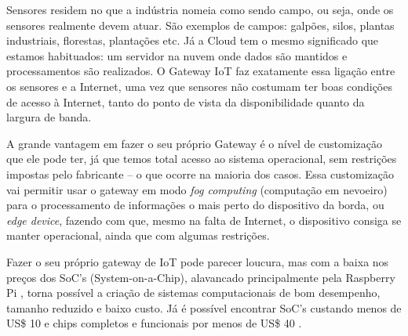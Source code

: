 Sensores residem no que a indústria nomeia como sendo campo, ou seja, onde os sensores realmente devem atuar. São exemplos de campos: galpões, silos, plantas industriais, florestas, plantações etc. Já a Cloud tem o mesmo significado que estamos habituados: um servidor na nuvem onde dados são mantidos e processamentos são realizados. O Gateway IoT faz exatamente essa ligação entre os sensores e a Internet, uma vez que sensores não costumam ter boas condições de acesso à Internet, tanto do ponto de vista da disponibilidade quanto da largura de banda.

A grande vantagem em fazer o seu próprio Gateway é o nível de customização que ele pode ter, já que temos total acesso ao sistema operacional, sem restrições impostas pelo fabricante – o que ocorre na maioria dos casos. Essa customização vai permitir usar o gateway em modo \textit{fog computing} (computação em nevoeiro) para o processamento de informações o mais perto do dispositivo da borda, ou \textit{edge device}, fazendo com que, mesmo na falta de Internet, o dispositivo consiga se manter operacional, ainda que com algumas restrições.

Fazer o seu próprio gateway de IoT pode parecer loucura, mas com a baixa nos preços dos SoC’s (System-on-a-Chip), alavancado principalmente pela Raspberry Pi \cite{RaspberryPi}, torna possível a criação de sistemas computacionais de bom desempenho, tamanho reduzido e baixo custo. Já é possível encontrar SoC’s custando menos de US\$ 10 e chips completos e funcionais por menos de US\$ 40 \cite{RaspberryPiVenda}.